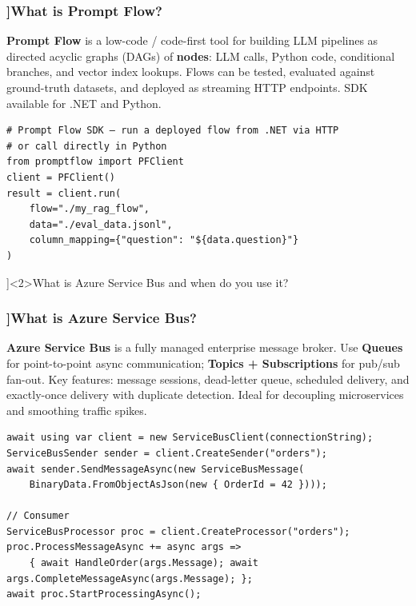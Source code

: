 \begin{frame}[fragile]
  \frametitle{\AnswerTitle[\CategoryBadge[AzureColor!20]{Azure}]{What is Prompt Flow?}}

  {\footnotesize
  \textbf{Prompt Flow} is a low-code / code-first tool for building LLM pipelines as directed acyclic graphs (DAGs) of \textbf{nodes}: LLM calls, Python code, conditional branches, and vector index lookups. Flows can be tested, evaluated against ground-truth datasets, and deployed as streaming HTTP endpoints. SDK available for .NET and Python.
  }

  \begin{verbatim}
# Prompt Flow SDK – run a deployed flow from .NET via HTTP
# or call directly in Python
from promptflow import PFClient
client = PFClient()
result = client.run(
    flow="./my_rag_flow",
    data="./eval_data.jsonl",
    column_mapping={"question": "${data.question}"}
)
  \end{verbatim}
\end{frame}

\QuestionSlide[\CategoryBadge[AzureColor!20]{Azure}]<2>{What is Azure Service Bus and when do you use it?}

\begin{frame}[fragile]
  \frametitle{\AnswerTitle[\CategoryBadge[AzureColor!20]{Azure}]{What is Azure Service Bus?}}

  {\footnotesize
  \textbf{Azure Service Bus} is a fully managed enterprise message broker. Use \textbf{Queues} for point-to-point async communication; \textbf{Topics + Subscriptions} for pub/sub fan-out. Key features: message sessions, dead-letter queue, scheduled delivery, and exactly-once delivery with duplicate detection. Ideal for decoupling microservices and smoothing traffic spikes.
  }

  \begin{verbatim}
await using var client = new ServiceBusClient(connectionString);
ServiceBusSender sender = client.CreateSender("orders");
await sender.SendMessageAsync(new ServiceBusMessage(
    BinaryData.FromObjectAsJson(new { OrderId = 42 })));

// Consumer
ServiceBusProcessor proc = client.CreateProcessor("orders");
proc.ProcessMessageAsync += async args =>
    { await HandleOrder(args.Message); await args.CompleteMessageAsync(args.Message); };
await proc.StartProcessingAsync();
  \end{verbatim}
\end{frame}

